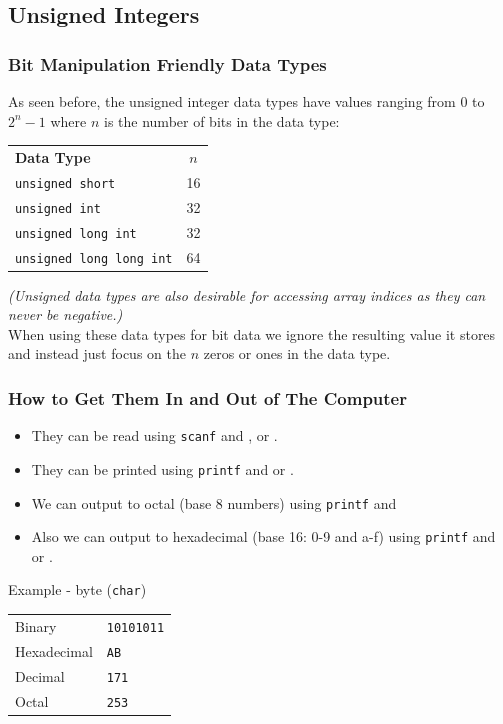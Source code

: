 \documentclass[smaller,handout,table]{beamer}
\begin{document}
\subsection{Unsigned Integers}
\begin{frame}
\frametitle{Bit Manipulation Friendly Data Types}
As seen before, the unsigned integer data types have values ranging from 0 to $2^n-1$ where $n$ is the number of bits in the data type:
\begin{center}
\begin{tabular}{l c}
\bf Data Type&\bf$n$\\
\tt unsigned short&16\\
\tt unsigned int&32\\
\tt unsigned long int&32\\
\tt unsigned long long int&64\\
\end{tabular}
\end{center}
\textit{(Unsigned data types are also desirable for accessing array indices as they can never be negative.)}\\
When using these data types for bit data we ignore the resulting value it stores and instead just focus on the $n$ zeros or ones in the data type.
\end{frame}

\begin{frame}
\frametitle{How to Get Them In and Out of The Computer}
\begin{itemize}
\item They can be read using {\tt scanf} and {\tt {}}, {\tt {}}
 or {\tt {}}.
\item They can be printed using {\tt printf} and {\tt {}} or {\tt {}}.
\item We can output to octal (base 8 numbers) using {\tt printf} and {\tt {}}
\item Also we can output to hexadecimal (base 16: 0-9 and a-f) using {\tt printf} and {\tt {}} or {\tt {}}.
\end{itemize}
\begin{block}{Example - byte ({\tt char})}
\begin{tabular}{l l}
Binary&\tt10101011\\
Hexadecimal&\tt AB\\
Decimal&\tt171\\
Octal&\tt253
\end{tabular}
\end{block}
\end{frame}
\end{document}

